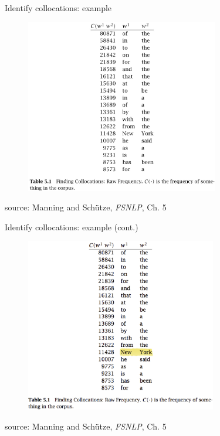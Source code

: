 \documentclass[english]{beamer}
\begin{document}
\begin{frame}{Identify collocations: example}
\begin{figure}[h]
\begin{centering}
\includegraphics[height=3in]{Images/fig15}
\end{centering}
\end{figure}
\begin{center}
source: Manning and Sch\"{u}tze, \textit{FSNLP}, Ch. 5
\end{center}
\end{frame}

\begin{frame}{Identify collocations: example (cont.)}
\begin{figure}[h]
\begin{centering}
\includegraphics[height=3in]{Images/fig16}
\end{centering}
\end{figure}
\begin{center}
source: Manning and Sch\"{u}tze, \textit{FSNLP}, Ch. 5
\end{center}
\end{frame}
\end{document}
